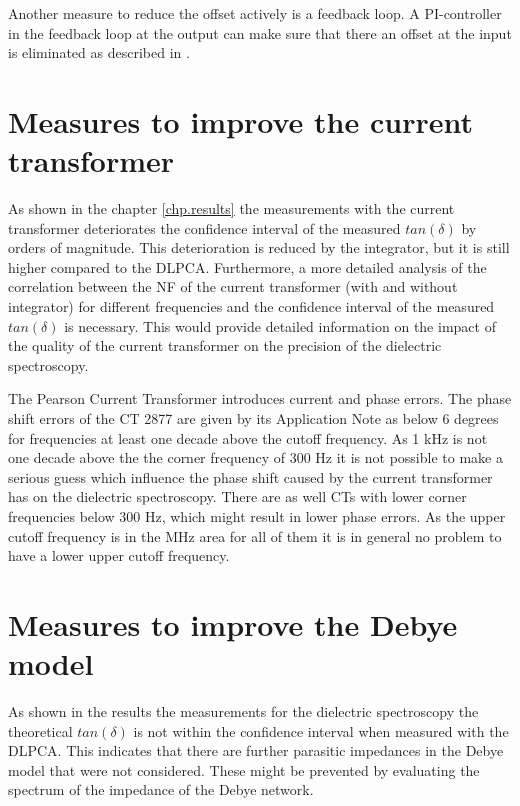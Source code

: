 Another measure to reduce the offset actively is a feedback loop. A PI-controller in the feedback loop at the output can make sure that there an offset at the input is eliminated as described in \cite{thomas}. 

\section{Measures to improve the current transformer}
As shown in the chapter \ref{chp.results} the measurements with the current transformer deteriorates the confidence interval of the measured $tan(\delta)$ by orders of magnitude. This deterioration is reduced by the integrator, but it is still higher compared to the DLPCA. 
Furthermore, a more detailed analysis of the correlation between the NF of the current transformer (with and without integrator) for different frequencies and the confidence interval of the measured $tan(\delta)$ is necessary. This would provide detailed information on the impact of the quality of the current transformer on the precision of the dielectric spectroscopy. 

The Pearson Current Transformer introduces current and phase errors. The phase shift errors of the CT 2877 are given by its Application Note \protect\footnotemark as below 6 degrees for frequencies at least one decade above the cutoff frequency. 
As 1 kHz is not one decade above the the corner frequency of 300 Hz it is not possible to make a serious guess which influence the phase shift caused by the current transformer has on the dielectric spectroscopy. There are as well CTs with lower corner frequencies below 300 Hz, which might result in lower phase errors. As the upper cutoff frequency is in the MHz area for all of them it is in general no problem to have a lower upper cutoff frequency. 

\section{Measures to improve the Debye model}
\label{debyemodel}
As shown in the results the measurements for the dielectric spectroscopy the theoretical $tan(\delta)$ is not within the confidence interval when measured with the DLPCA. This indicates that there are further parasitic impedances in the Debye model that were not considered. These might be prevented by evaluating the spectrum of the impedance of the Debye network. 


